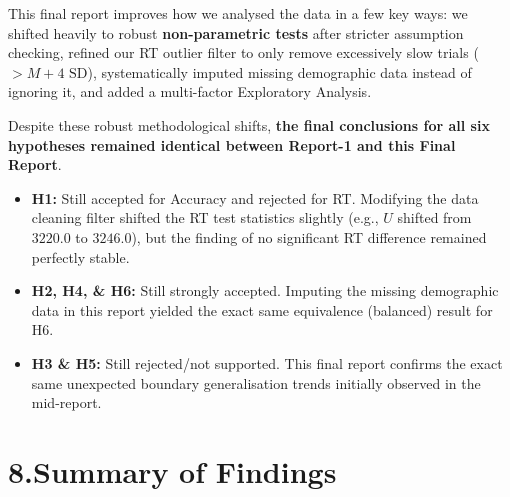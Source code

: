 \documentclass[11pt]{article}
\begin{document}
This final report improves how we analysed the data in a few key ways: we shifted heavily to robust \textbf{non-parametric tests} after stricter assumption checking, refined our RT outlier filter to only remove excessively slow trials ($> M + 4 \text{ SD}$), systematically imputed missing demographic data instead of ignoring it, and added a multi-factor Exploratory Analysis.

Despite these robust methodological shifts, \textbf{the final conclusions for all six hypotheses remained identical between Report-1 and this Final Report}. 

\begin{itemize}
    \item \textbf{H1:} Still accepted for Accuracy and rejected for RT. Modifying the data cleaning filter shifted the RT test statistics slightly (e.g., $U$ shifted from $3220.0$ to $3246.0$), but the finding of no significant RT difference remained perfectly stable.
    \item \textbf{H2, H4, \& H6:} Still strongly accepted. Imputing the missing demographic data in this report yielded the exact same equivalence (balanced) result for H6.
    \item \textbf{H3 \& H5:} Still rejected/not supported. This final report confirms the exact same unexpected boundary generalisation trends initially observed in the mid-report.
\end{itemize}



\section*{8.\quad Summary of Findings}
\end{document}

